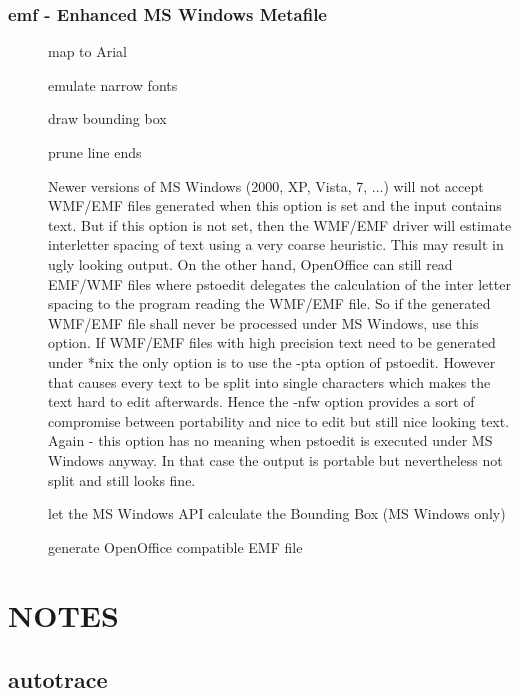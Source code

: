 \documentclass[english,a4paper]{article}
\begin{document}
\subsubsection{emf - Enhanced MS Windows Metafile}
\begin{description}
\item[]
map to Arial


\item[]
emulate narrow fonts


\item[]
draw bounding box


\item[]
prune line ends


\item[]
Newer versions of MS Windows (2000, XP, Vista, 7, ...) will not accept WMF/EMF files generated when this option is set and the input contains text. But if this option is not set, then the WMF/EMF driver will estimate interletter spacing of text using a very coarse heuristic. This may result in ugly looking output. On the other hand, OpenOffice can still read EMF/WMF files where pstoedit delegates the calculation of the inter letter spacing to the program reading the WMF/EMF file. So if the generated WMF/EMF file shall never be processed under MS Windows, use this option. If WMF/EMF files with high precision text need to be generated under *nix the only option is to use the -pta option of pstoedit. However that causes every text to be split into single characters which makes the text hard to edit afterwards. Hence the -nfw option provides a sort of compromise between portability and nice to edit but still nice looking text. Again - this option has no meaning when pstoedit is executed under MS Windows anyway. In that case the output is portable but nevertheless not split and still looks fine.


\item[]
let the MS Windows API calculate the Bounding Box (MS Windows only)


\item[]
generate OpenOffice compatible EMF file


\end{description}

\section{NOTES}


  \subsection{autotrace}
\end{document}
